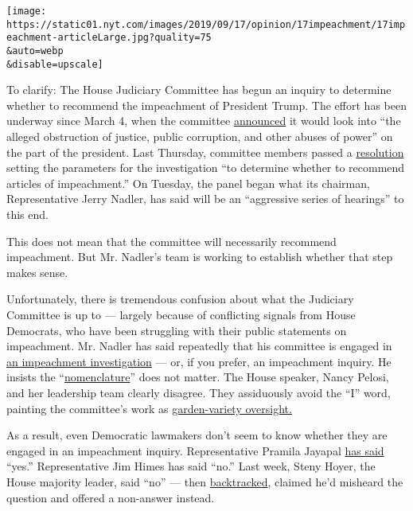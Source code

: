 \texttt{[image: https://static01.nyt.com/images/2019/09/17/opinion/17impeachment/17impeachment-articleLarge.jpg?quality=75\\\&auto=webp\\\&disable=upscale]}

To clarify: The House Judiciary Committee has begun an inquiry to
determine whether to recommend the impeachment of President Trump. The
effort has been underway since March 4, when the committee
\href{https://judiciary.house.gov/news/press-releases/house-judiciary-committee-unveils-investigation-threats-against-rule-law}{announced}
it would look into ``the alleged obstruction of justice, public
corruption, and other abuses of power'' on the part of the president.
Last Thursday, committee members passed a
\href{https://bass.house.gov/sites/karenbass.house.gov/files/Resolution\%20for\%20Investigative\%20Procedures.pdf}{resolution}
setting the parameters for the investigation ``to determine whether to
recommend articles of impeachment.'' On Tuesday, the panel began what
its chairman, Representative Jerry Nadler, has said will be an
``aggressive series of hearings'' to this end.

This does not mean that the committee will necessarily recommend
impeachment. But Mr. Nadler's team is working to establish whether that
step makes sense.

Unfortunately, there is tremendous confusion about what the Judiciary
Committee is up to --- largely because of conflicting signals from House
Democrats, who have been struggling with their public statements on
impeachment. Mr. Nadler has said repeatedly that his committee is
engaged in
\href{https://www.nytimes.com/2019/09/13/us/politics/trump-impeachment-definition.html}{an
impeachment investigation} --- or, if you prefer, an impeachment
inquiry. He insists the
``\href{https://nadler.house.gov/news/documentsingle.aspx?DocumentID=394065}{nomenclature}''
does not matter. The House speaker, Nancy Pelosi, and her leadership
team clearly disagree. They assiduously avoid the ``I'' word, painting
the committee's work as
\href{https://www.nytimes.com/2019/04/22/us/politics/impeaching-trump-pelosi.html}{garden-variety
oversight.}

As a result, even Democratic lawmakers don't seem to know whether they
are engaged in an impeachment inquiry. Representative Pramila Jayapal
\href{https://www.politico.com/story/2019/09/10/impeachment-democrats-trump-1488401}{has
said} ``yes.'' Representative Jim Himes has said ``no.'' Last week,
Steny Hoyer, the House majority leader, said ``no'' --- then
\href{https://www.cnn.com/2019/09/12/politics/impeachment-investigation-vote-house-judiciary-committee/index.html}{backtracked},
claimed he'd misheard the question and offered a non-answer instead.

